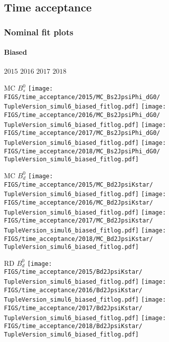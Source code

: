 \subsection{Time acceptance}







\begin{frame} %
\frametitle{Nominal fit plots}
\framesubtitle{Biased}

  \phantom{2020} \hspace*{1.5cm} $2015$ \hspace*{1.5cm} $2016$ \hspace*{1.5cm} $2017$ \hspace*{1.5cm} $2018$

  MC $B_s^0$
  \texttt{[image: \\FIGS/time\_acceptance/2015/MC\_Bs2JpsiPhi\_dG0/\\TupleVersion\_simul6\_biased\_fitlog.pdf]}
  \texttt{[image: \\FIGS/time\_acceptance/2016/MC\_Bs2JpsiPhi\_dG0/\\TupleVersion\_simul6\_biased\_fitlog.pdf]}
  \texttt{[image: \\FIGS/time\_acceptance/2017/MC\_Bs2JpsiPhi\_dG0/\\TupleVersion\_simul6\_biased\_fitlog.pdf]}
  \texttt{[image: \\FIGS/time\_acceptance/2018/MC\_Bs2JpsiPhi\_dG0/\\TupleVersion\_simul6\_biased\_fitlog.pdf]}
  \vspace*{2mm}

  MC $B_d^0$
  \texttt{[image: \\FIGS/time\_acceptance/2015/MC\_Bd2JpsiKstar/\\TupleVersion\_simul6\_biased\_fitlog.pdf]}
  \texttt{[image: \\FIGS/time\_acceptance/2016/MC\_Bd2JpsiKstar/\\TupleVersion\_simul6\_biased\_fitlog.pdf]}
  \texttt{[image: \\FIGS/time\_acceptance/2017/MC\_Bd2JpsiKstar/\\TupleVersion\_simul6\_biased\_fitlog.pdf]}
  \texttt{[image: \\FIGS/time\_acceptance/2018/MC\_Bd2JpsiKstar/\\TupleVersion\_simul6\_biased\_fitlog.pdf]}
  \vspace*{2mm}

  RD $B_d^0$
  \texttt{[image: \\FIGS/time\_acceptance/2015/Bd2JpsiKstar/\\TupleVersion\_simul6\_biased\_fitlog.pdf]}
  \texttt{[image: \\FIGS/time\_acceptance/2016/Bd2JpsiKstar/\\TupleVersion\_simul6\_biased\_fitlog.pdf]}
  \texttt{[image: \\FIGS/time\_acceptance/2017/Bd2JpsiKstar/\\TupleVersion\_simul6\_biased\_fitlog.pdf]}
  \texttt{[image: \\FIGS/time\_acceptance/2018/Bd2JpsiKstar/\\TupleVersion\_simul6\_biased\_fitlog.pdf]}

\end{frame} %



